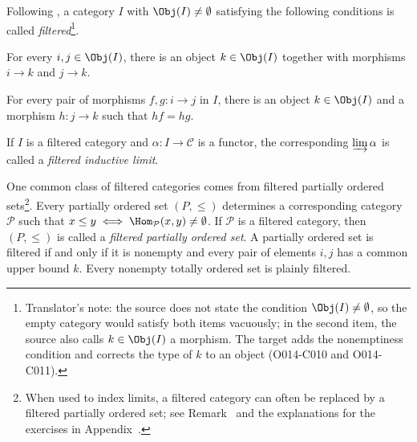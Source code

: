 \begin{definition}
	Following \cite[Definition 2.7.6]{Li1}, a category $I$ with
	$\Obj(I)\neq\emptyset$ satisfying the following conditions is called
	\emph{filtered}\footnote{Translator's note: the source does not state the
	condition $\Obj(I)\neq\emptyset$, so the empty category would satisfy both
	items vacuously; in the second item, the source also calls
	$k\in\Obj(I)$ a morphism. The target adds the nonemptiness condition and
	corrects the type of $k$ to an object (O014-C010 and O014-C011).}.
	\begin{compactitem}
		\item For every $i, j \in \Obj(I)$, there is an object
		$k \in \Obj(I)$ together with morphisms $i \rightarrow k$ and
		$j \rightarrow k$.
		\item For every pair of morphisms $f, g: i \to j$ in $I$, there is an
		object $k \in \Obj(I)$ and a morphism $h: j \to k$ such that $hf = hg$.
	\end{compactitem}

	If $I$ is a filtered category and $\alpha: I \to \mathcal{C}$ is a
	functor, the corresponding $\varinjlim \alpha$ is called a
	\emph{filtered inductive limit}.
\end{definition}

\begin{example}\label{eg:filtered-poset}
	One common class of filtered categories comes from filtered partially
	ordered sets\footnote{When used to index limits, a filtered category can
	often be replaced by a filtered partially ordered set; see
	Remark~ and the explanations for
	the exercises in Appendix~.}. Every
	partially ordered set $(P, \leq)$ determines a corresponding category
	$\mathcal{P}$ such that
	$x \leq y  \iff \Hom_{\mathcal{P}}(x, y) \neq \emptyset$. If
	$\mathcal{P}$ is a filtered category, then $(P, \leq)$ is called a
	\emph{filtered partially ordered set}. A partially ordered set is filtered
	if and only if it is nonempty and every pair of elements $i, j$ has a common
	upper bound $k$. Every nonempty totally ordered set is plainly filtered.
\end{example}

